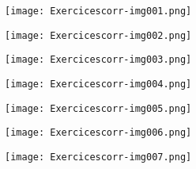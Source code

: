 \documentclass[a4paper]{article}
\title{}
\author{}
\date{2017-09-15}
\begin{document}
\begin{figure}
\centering
\texttt{[image: Exercicescorr-img001.png]}
\end{figure}

\bigskip



\begin{figure}
\centering
\texttt{[image: Exercicescorr-img002.png]}
\end{figure}

\bigskip


\bigskip



\begin{figure}
\centering
\texttt{[image: Exercicescorr-img003.png]}
\end{figure}

\bigskip


\bigskip



\begin{figure}
\centering
\texttt{[image: Exercicescorr-img004.png]}
\end{figure}

\bigskip


\bigskip



\begin{figure}
\centering
\texttt{[image: Exercicescorr-img005.png]}
\end{figure}

\bigskip


\bigskip



\begin{figure}
\centering
\texttt{[image: Exercicescorr-img006.png]}
\end{figure}

\bigskip


\bigskip


\begin{figure}
\centering
\texttt{[image: Exercicescorr-img007.png]}
\end{figure}
\end{document}
